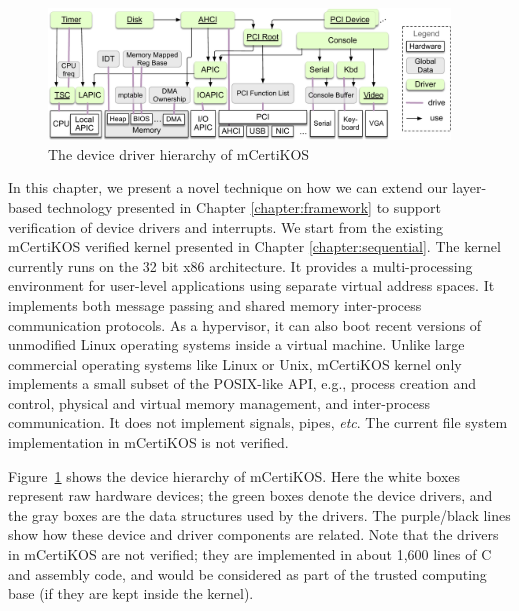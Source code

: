 \begin{figure}[t]
\begin{center}
\includegraphics[width=0.95\textwidth]{figs/devices}
\end{center}
\caption{The device driver hierarchy of mCertiKOS}
\label{fig:overview:device}
\end{figure}

In this chapter, we present a novel technique on how we can extend
our layer-based technology presented in Chapter \ref{chapter:framework}
to support verification of device drivers and interrupts.
We start from the existing mCertiKOS verified kernel presented in
Chapter \ref{chapter:sequential}. 
The kernel currently runs on the 32 bit x86 architecture.
It provides a multi-processing environment for user-level applications
using separate virtual address spaces. It implements both message
passing and shared memory inter-process communication protocols. As a
hypervisor, it can also boot recent versions of unmodified Linux
operating systems inside a virtual machine.  Unlike large commercial
operating systems like Linux or Unix, mCertiKOS kernel only implements
a small subset of the POSIX-like API, e.g., process creation and
control, physical and virtual memory management, and
inter-process communication. It does
not implement signals, pipes, {\it etc}. The current file system
implementation in mCertiKOS is not verified. 

Figure~\ref{fig:overview:device} shows the device hierarchy of mCertiKOS. Here
the white boxes represent raw hardware devices; the green boxes denote the
device drivers, and the gray boxes are the data structures used by the drivers.
The purple/black lines show how these device and driver components are related.
Note that the drivers in mCertiKOS are not verified; they are implemented in
about 1,600 lines of C and assembly code, and would be considered as part of the
trusted computing base (if they are kept inside the kernel). 


